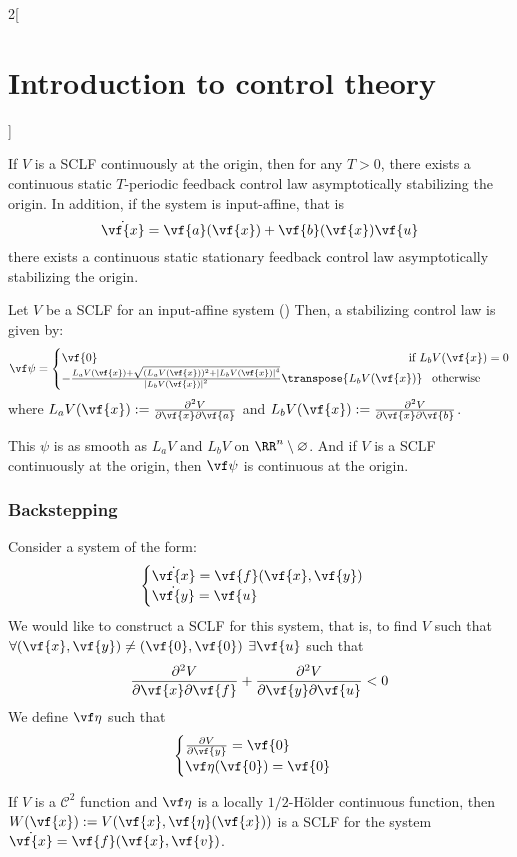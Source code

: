\documentclass[../../../main_math.tex]{subfiles}
\begin{document}
\begin{multicols}{2}[\section{Introduction to control theory}]
\begin{theorem}
    If $V$ is a SCLF continuously at the origin, then for any $T>0$, there exists a continuous static $T$-periodic feedback control law asymptotically stabilizing the origin. In addition, if the system is input-affine, that is
    \begin{equation}\label{ICT:inputaffine}
      \dot{\vf{x}} = \vf{a}(\vf{x}) + \vf{b}(\vf{x})\vf{u}
    \end{equation}
    there exists a continuous static stationary feedback control law asymptotically stabilizing the origin.
  \end{theorem}
  \begin{theorem}
    Let $V$ be a SCLF for an input-affine system () Then, a stabilizing control law is given by:
    $$
      \vf\psi=\begin{cases}
        \vf{0}                                                                                                          & \!\!\!\!\!\!\!\!\!\!\!\!\!\text{if } L_bV(\vf{x})=0 \\
        -\frac{L_aV(\vf{x})+\sqrt{(L_aV(\vf{x}))^2+\abs{L_bV(\vf{x})}^4}}{\abs{L_bV(\vf{x})}^2}\transpose{L_bV(\vf{x})} & \!\text{otherwise}
      \end{cases}
    $$
    where $L_aV(\vf{x}):=\pdv{V}{\vf{x}}\vf{a}(\vf{x})$ and $L_bV(\vf{x}):=\pdv{V}{\vf{x}}\vf{b}(\vf{x})$.
  \end{theorem}
  \begin{remark}
    This $\psi$ is as smooth as $L_aV$ and $L_bV$ on $\RR^n\setminus\varnothing$. And if $V$ is a SCLF continuously at the origin, then $\vf\psi$ is continuous at the origin.
  \end{remark}
  \subsubsection{Backstepping}
  Consider a system of the form:
  \begin{equation}\label{ICT:backstepping}
    \begin{cases}
      \dot{\vf{x}} = \vf{f}(\vf{x}, \vf{y}) \\
      \dot{\vf{y}} = \vf{u}
    \end{cases}
  \end{equation}
  We would like to construct a SCLF for this system, that is, to find $V$ such that $\forall (\vf{x}, \vf{y})\ne (\vf{0}, \vf{0})$ $\exists \vf{u}$ such that $$
    \pdv{V}{\vf{x}}\vf{f}(\vf{x}, \vf{y}) + \pdv{V}{\vf{y}}\vf{u}<0
  $$
  We define $\vf\eta$ such that
  $$
    \begin{cases}
      \pdv{V}{\vf{y}}(\vf{x}, \vf{\eta}(\vf{x})) = \vf{0} \\
      \vf\eta(\vf{0}) = \vf{0}
    \end{cases}
  $$
  \begin{lemma}
    If $V$ is a $\mathcal{C}^2$ function and $\vf\eta$ is a locally $1/2$-Hölder continuous function, then $W(\vf{x}):=V(\vf{x}, \vf{\eta}(\vf{x}))$ is a SCLF for the system $\dot{\vf{x}} = \vf{f}(\vf{x}, \vf{v})$.
  \end{lemma}


\end{multicols}
\end{document}
